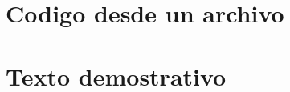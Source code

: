 \documentclass[12pt,a4paper,oneside]{article}
\title{\titulodoc}
\author{\autordoc}
\date{\fechadoc}
\begin{document}
\maketitle
\section{Codigo desde un archivo}



\section{Texto demostrativo}
\lipsum[1]
\lipsum[2,6]
\end{document}
